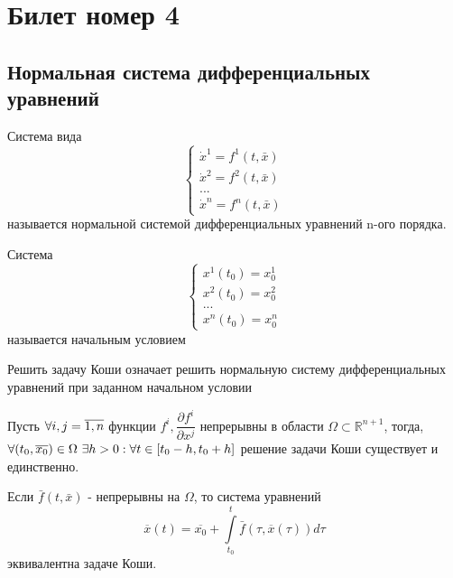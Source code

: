 



\section*{Билет номер 4}
	\subsection*{Нормальная система дифференциальных уравнений}
	
	\begin{definition}
		Система вида
		\begin{equation*}
			\begin{cases*}
				\dot{x}^1 = f^1(t, \bar{x}) \\
				\dot{x}^2 = f^2(t, \bar{x}) \\
				... \\
				\dot{x}^n = f^n(t, \bar{x})
			\end{cases*}
		\end{equation*}
		называется нормальной системой дифференциальных уравнений n-ого порядка.
		
	\end{definition}

	\begin{definition}
		Система
		\begin{equation*}
			\begin{cases*}
				x^1(t_0) = x_0^1 \\
				x^2(t_0) = x_0^2 \\
				... \\
				x^n(t_0) = x_0^n
			\end{cases*}
		\end{equation*}
		называется начальным условием
	\end{definition}	

	\begin{proposition}
		Решить задачу Коши означает решить нормальную систему дифференциальных уравнений при заданном начальном условии
	\end{proposition}
	
	\begin{theorem}
		Пусть $\forall i, j \hm= \overline{1, n}$ функции $f^i, \dfrac{\partial{f^i}}{\partial{x^j}}$ непрерывны в области $\Omega \subset \mathbb{R}^{n+1}$, тогда, $\forall (t_0, \overline{x_0}) \in \Omega \text{ } \exists h>0 : \forall t \hm\in [t_0-h, t_0+h]$ решение задачи Коши существует и единственно.
	\end{theorem}

	\begin{lemma}
		Если $\bar{f}(t, \bar{x})$ - непрерывны на $\Omega$, то система уравнений
		\begin{equation*}
			\overline{x}(t) = \overline{x_0} + \int\limits_{t_0}^t\bar{f}(\tau, \overline{x}(\tau))d\tau
		\end{equation*}
		эквивалентна задаче Коши.
	\end{lemma}
	
	
	
	
	
	
	
	
	
	
	
	
	
